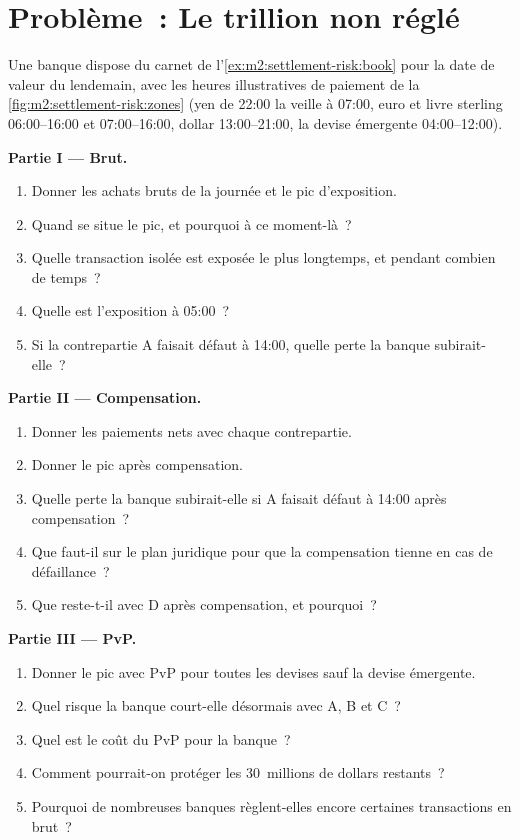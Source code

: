 \section{Problème~: Le trillion non réglé}

\begin{problem}\label{pb:m2:settlement-risk:1}
Une banque dispose du carnet de l'\cref{ex:m2:settlement-risk:book} pour la date de valeur du lendemain,
avec les heures illustratives de paiement de la \cref{fig:m2:settlement-risk:zones} (yen
de 22:00 la veille à 07:00, euro et livre sterling 06:00--16:00 et
07:00--16:00, dollar 13:00--21:00, la devise émergente 04:00--12:00).

\medskip\noindent\textbf{Partie I --- Brut.}
\begin{enumerate}
\item Donner les achats bruts de la journée et le pic d'exposition.
\item Quand se situe le pic, et pourquoi à ce moment-là~?
\item Quelle transaction isolée est exposée le plus longtemps, et pendant combien de temps~?
\item Quelle est l'exposition à 05:00~?
\item Si la contrepartie A faisait défaut à 14:00, quelle perte la banque subirait-elle~?
\end{enumerate}

\medskip\noindent\textbf{Partie II --- Compensation.}
\begin{enumerate}[resume]
\item Donner les paiements nets avec chaque contrepartie.
\item Donner le pic après compensation.
\item Quelle perte la banque subirait-elle si A faisait défaut à 14:00 après compensation~?
\item Que faut-il sur le plan juridique pour que la compensation tienne en cas de défaillance~?
\item Que reste-t-il avec D après compensation, et pourquoi~?
\end{enumerate}

\medskip\noindent\textbf{Partie III --- PvP.}
\begin{enumerate}[resume]
\item Donner le pic avec PvP pour toutes les devises sauf la devise émergente.
\item Quel risque la banque court-elle désormais avec A, B et C~?
\item Quel est le coût du PvP pour la banque~?
\item Comment pourrait-on protéger les 30~millions de dollars restants~?
\item Pourquoi de nombreuses banques règlent-elles encore certaines transactions en brut~?
\end{enumerate}


\end{problem}
